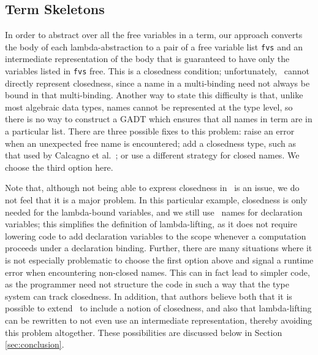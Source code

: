 \documentclass[natbib]{sigplanconf}
\begin{document}
\subsection{Term Skeletons}
\label{subsec:term-skeletons}

In order to abstract over all the free variables in a term, our
approach converts the body of each lambda-abstraction to a pair of a
free variable list \lstinline{fvs} and an intermediate representation
of the body that is guaranteed to have only the variables listed in
\lstinline{fvs} free. This is a closedness condition; unfortunately,
\ourlib\ cannot directly represent closedness, since a name in a
multi-binding need not always be bound in that multi-binding.  Another
way to state this difficulty is that, unlike most algebraic data
types, names cannot be represented at the type level, so there is no
way to construct a GADT which ensures that all names in term are in a
particular list. There are three possible fixes to this problem: raise
an error when an unexpected free name is encountered; add a closedness
type, such as that used by Calcagno et al.~\cite{calcagno00}; or use a
different strategy for closed names. We choose the third option here.


Note that, although not being able to express closedness in \ourlib\
is an issue, we do not feel that it is a major problem.  In this
particular example, closedness is only needed for the lambda-bound
variables, and we still use \ourlib\ names for declaration variables;
this simplifies the definition of lambda-lifting, as it does not
require lowering code to add declaration variables to the scope
whenever a computation proceeds under a declaration binding.  Further,
there are many situations where it is not especially problematic to
choose the first option above and signal a runtime error when
encountering non-closed names. This can in fact lead to simpler code,
as the programmer need not structure the code in such a way that the
type system can track closedness.  In addition, that
authors believe both that it is possible to extend \ourlib\ to include
a notion of closedness, and also that lambda-lifting can be rewritten
to not even use an intermediate representation, thereby avoiding this
problem altogether. These possibilities are discussed below in Section
\ref{sec:conclusion}.
\end{document}
